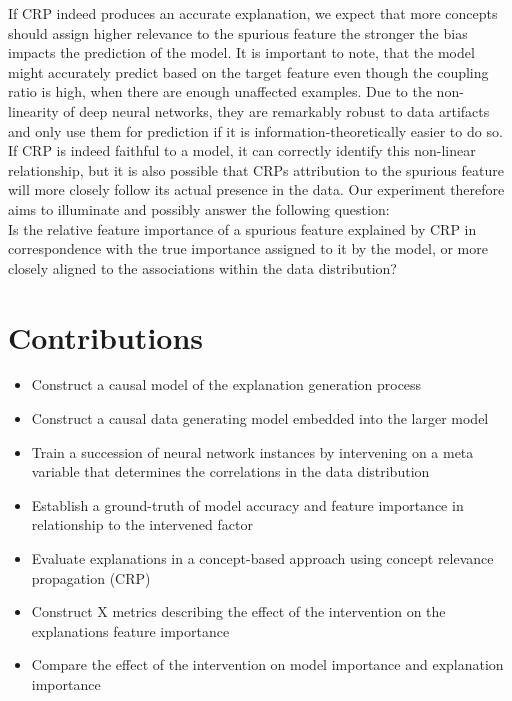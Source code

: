 If CRP indeed produces an accurate explanation, we expect that more concepts should assign higher relevance to the spurious feature the stronger the bias impacts the prediction of the model. It is important to note, that the model might accurately predict based on the target feature even though the coupling ratio is high, when there are enough unaffected examples. Due to the non-linearity of deep neural networks, they are remarkably robust to data artifacts and only use them for prediction if it is information-theoretically easier to do so.
If CRP is indeed faithful to a model, it can correctly identify this non-linear relationship, but it is also possible that CRPs attribution to the spurious feature will more closely follow its actual presence in the data. 
Our experiment therefore aims to illuminate and possibly answer the following question: \\
Is the relative feature importance of a spurious feature explained by CRP in correspondence with the true importance assigned to it by the model, or more closely aligned to the associations within the data distribution?


\section{Contributions}
\begin{itemize}
    \item Construct a causal model of the explanation generation process
    \item Construct a causal data generating model embedded into the larger model
    \item Train a succession of neural network instances by intervening on a meta variable that determines the correlations in the data distribution
    \item Establish a ground-truth of model accuracy and feature importance in relationship to the intervened factor
    \item Evaluate explanations in a concept-based approach using concept relevance propagation (CRP)
    \item Construct X metrics describing the effect of the intervention on the explanations feature importance 
    \item Compare the effect of the intervention on model importance and explanation importance
\end{itemize}

